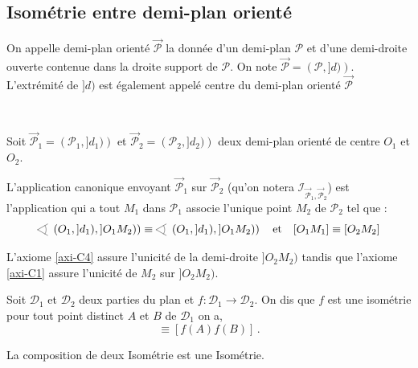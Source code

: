         \subsection{Isométrie entre demi-plan orienté}

\begin{defi}
On appelle demi-plan orienté $\overrightarrow{\mathcal{P}}$ la donnée d'un demi-plan $\mathcal{P}$ et d'une demi-droite ouverte contenue dans la droite support de $\mathcal{P}$. On note $\overrightarrow{\mathcal{P}} = \left(\mathcal{P},]d)\right)$. L'extrémité de $]d)$ est également appelé centre du demi-plan orienté $\overrightarrow{\mathcal{P}}$
\end{defi}

\begin{defi}\,

Soit $\overrightarrow{\mathcal{P}}_1 = \left(\mathcal{P}_1,]d_1)\right)$ et $\overrightarrow{\mathcal{P}}_2 = \left(\mathcal{P}_2,]d_2)\right)$ deux demi-plan orienté de centre $O_1$ et $O_2$. 

L'application canonique envoyant $\overrightarrow{\mathcal{P}}_1$ sur $\overrightarrow{\mathcal{P}}_2$ (qu'on notera $\mathcal{I}_{\overrightarrow{\mathcal{P}}_1,\overrightarrow{\mathcal{P}}_2}$) est l'application qui a tout $M_1$ dans $\mathcal{P}_1$ associe l'unique point $M_2$ de $\mathcal{P}_2$ tel que :
\begin{equation*}
    \anglesaillant \left(O_1,]d_1),]O_1 M_2)\right)\equiv \anglesaillant \left(O_1,]d_1),]O_1 M_2)\right) \quad\text{et}\quad [O_1 M_1]\equiv [O_2 M_2]
\end{equation*}
\end{defi}
\begin{rema}
    L'axiome \ref{axi-C4} assure l'unicité de la demi-droite $]O_2 M_2)$ tandis que l'axiome \ref{axi-C1} assure l'unicité de $M_2$ sur $]O_2 M_2)$.
\end{rema}
\begin{defi}[Isométrie]
    Soit $\mathcal{D}_1$ et $\mathcal{D}_2$ deux parties du plan et $f : \mathcal{D}_1 \to \mathcal{D}_2$. On dis que $f$ est une isométrie \ssi pour tout point distinct $A$ et $B$ de $\mathcal{D}_1$ on a,
    \begin{equation*}
        [AB]\equiv [f(A)f(B)]\,.
    \end{equation*}
\end{defi}
\begin{prop}
    La composition de deux Isométrie est une Isométrie.
\end{prop}
